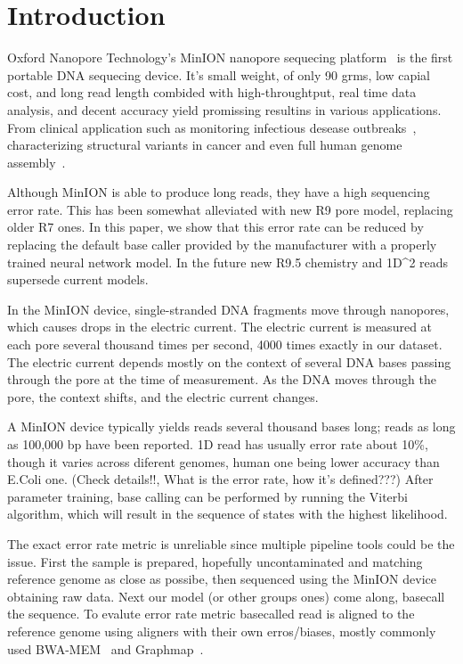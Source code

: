 \documentclass[times, utf8, seminar, numeric]{fer}
\begin{document}
\chapter{Introduction}

Oxford Nanopore Technology's MinION nanopore sequecing platform~\cite{mikheyev2014first} is the first portable DNA sequecing device. It's small weight, of only 90 grms, low capial cost, and long read length combided with high-throughtput, real time data analysis, and decent accuracy yield promissing resultins in various applications. From clinical application such as monitoring infectious desease outbreaks~\cite{judge2015early}\cite{quick2016real}, characterizing structural variants in cancer\cite{norris2016nanopore} and even full human genome assembly~\cite{jain2017nanopore}.

Although MinION is able to produce long reads, they have a high sequencing error rate. This has been somewhat alleviated with new R9 pore model, replacing older R7 ones. In this paper, we show that this error rate can be reduced by replacing the default base caller provided by the manufacturer with a properly trained neural network model. In the future new R9.5 chemistry and 1D^2 reads supersede current models.

In the MinION device, single-stranded DNA fragments move through nanopores, which causes drops in the electric current. The electric current is measured at each pore several thousand times per second, 4000 times exactly in our dataset. The electric current depends mostly on the context of several DNA bases passing through the pore at the time of measurement. As the DNA moves through the pore, the context shifts, and the electric current changes.

A MinION device typically yields reads several thousand bases long; reads as long as 100,000 bp have been reported. 1D read has usually error rate about   10\%, though it varies across diferent genomes, human one being lower accuracy than E.Coli one. (Check details!!, What is the error rate, how it's defined???) After parameter training, base calling can be performed by running the Viterbi algorithm, which will result in the sequence of states with the highest likelihood.

The exact error rate metric is unreliable since multiple pipeline tools could be the issue. First the sample is prepared, hopefully uncontaminated and matching reference genome as close as possibe, then sequenced using the MinION device obtaining raw data. Next our model (or other groups ones) come along, basecall the sequence. To evalute error rate metric basecalled read is aligned to the reference genome using aligners with their own erros/biases, mostly commonly used BWA-MEM~\cite{li2013aligning} and Graphmap~\cite{sovic2016fast}.
\end{document}
